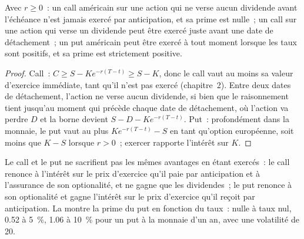 \begin{proposition}\label{prop:dv:american-options-and-early-exercise:when}
Avec $r\ge0$~: un call américain sur une action qui ne verse aucun dividende avant l'échéance n'est jamais
exercé par anticipation, et sa prime est nulle~; un call sur une action qui verse un dividende peut être
exercé juste avant une date de détachement~; un put américain peut être exercé à tout moment
lorsque les taux sont positifs, et sa prime est strictement positive.
\end{proposition}
\begin{proof}
Call~: $C\ge S-Ke^{-r(T-t)}\ge S-K$, donc le call vaut au moins sa valeur d'exercice
immédiate, tant qu'il n'est pas exercé (chapitre~2). Entre deux dates de détachement, l'action ne verse aucun dividende, si bien que le raisonnement tient
jusqu'au moment qui précède chaque date de détachement, où l'action va perdre $D$ et la borne
devient $S-D-Ke^{-r(T-t)}$. Put~: profondément dans la monnaie, le put vaut au plus $Ke^{-r(T-t)}-S$
en tant qu'option européenne, soit moins que $K-S$ lorsque $r>0$~; exercer rapporte l'intérêt sur $K$.
\end{proof}

Le call et le put ne sacrifient pas les mêmes avantages en étant exercés~: le call renonce à
l'intérêt sur le prix d'exercice qu'il paie par anticipation et à l'assurance de son optionalité, et ne gagne que
les dividendes~; le put renonce à son optionalité et gagne l'intérêt sur le prix d'exercice
qu'il reçoit par anticipation. La  montre la
prime du put en fonction du taux~: nulle à taux nul, 0.52 à 5~\%, 1.06 à 10~\% pour
un put à la monnaie d'un an, avec une volatilité de 20.

\begin{omfigure}

\label{fig:dv:american-options-and-early-exercise:premium}
\end{omfigure}

